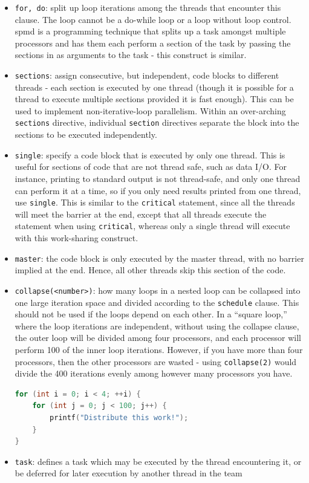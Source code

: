 \documentclass[10pt]{article}
\begin{document}
\begin{flushleft}
\begin{itemize}
\item {\tt for, do}: split up loop iterations among the threads that encounter this clause. The loop cannot be a do-while loop or a loop without loop control. \gls{spmd} is a programming technique that splits up a task amongst multiple processors and has them each perform a section of the task by passing the sections in as arguments to the task - this construct is similar.
\item {\tt sections}: assign consecutive, but independent, code blocks to different threads - each section is executed by one thread (though it is possible for a thread to execute multiple sections provided it is fast enough). This can be used to implement non-iterative-loop parallelism. Within an over-arching {\tt sections} directive, individual {\tt section} directives separate the block into the sections to be executed independently.
\item {\tt single}: specify a code block that is executed by only one thread. This is useful for sections of code that are not thread safe, such as data I/O. For instance, printing to standard output is not thread-safe, and only one thread can perform it at a time, so if you only need results printed from one thread, use {\tt single}. This is similar to the {\tt critical} statement, since all the threads will meet the barrier at the end, except that all threads execute the statement when using {\tt critical}, whereas only a single thread will execute with this work-sharing construct.
\item {\tt master}: the code block is only executed by the master thread, with no barrier implied at the end. Hence, all other threads skip this section of the code.
\item {\tt collapse(<number>)}: how many loops in a nested loop can be collapsed into one large iteration space and divided according to the {\tt schedule} clause. This should not be used if the loops depend on each other. In a ``square loop,'' where the loop iterations are independent, without using the collapse clause, the outer loop will be divided among four processors, and each processor will perform 100 of the inner loop iterations. However, if you have more than four processors, then the other processors are wasted - using {\tt collapse(2)} would divide the 400 iterations evenly among however many processors you have.

\begin{lstlisting}[language=C, basicstyle=\ttfamily\small]
for (int i = 0; i < 4; ++i) { 
	for (int j = 0; j < 100; j++) {
		printf("Distribute this work!");
	}
}
\end{lstlisting}
\item {\tt task}: defines a task which may be executed by the thread encountering it, or be deferred for later execution by another thread in the team
\end{itemize}


\end{flushleft}
\end{document}
